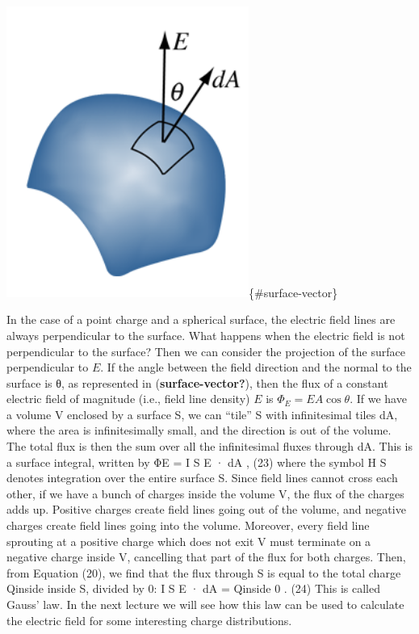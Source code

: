 \documentclass[
  letterpaper,
  DIV=11,
  numbers=noendperiod]{scrreprt}
\begin{document}
\includegraphics[width=3.125in,height=\textheight]{Figures/Gauss-surface-vector.png}\{\#surface-vector\}

In the case of a point charge and a spherical surface, the electric
field lines are always perpendicular to the surface. What happens when
the electric field is not perpendicular to the surface? Then we can
consider the projection of the surface perpendicular to \(E\). If the
angle between the field direction and the normal to the surface is θ, as
represented in (\textbf{surface-vector?}), then the flux of a constant
electric field of magnitude (i.e., field line density) \(E\) is
\(\Phi_E = EA \cos\theta\). If we have a volume V enclosed by a surface
S, we can ``tile'' S with infinitesimal tiles dA, where the area is
infinitesimally small, and the direction is out of the volume. The total
flux is then the sum over all the infinitesimal fluxes through dA. This
is a surface integral, written by ΦE = I S E · dA , (23) where the
symbol H S denotes integration over the entire surface S. Since field
lines cannot cross each other, if we have a bunch of charges inside the
volume V, the flux of the charges adds up. Positive charges create field
lines going out of the volume, and negative charges create field lines
going into the volume. Moreover, every field line sprouting at a
positive charge which does not exit V must terminate on a negative
charge inside V, cancelling that part of the flux for both charges.
Then, from Equation (20), we find that the flux through S is equal to
the total charge Qinside inside S, divided by 0: I S E · dA = Qinside 0
. (24) This is called Gauss' law. In the next lecture we will see how
this law can be used to calculate the electric field for some
interesting charge distributions.
\end{document}
